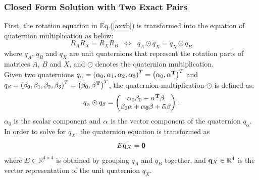 \documentclass[twocolumn,10pt]{asme2ej}
\newcommand{\qq}{{\bf q}}
\begin{document}
\subsubsection{Closed Form Solution with Two Exact Pairs}
First, the rotation equation in Eq.(\ref{axxb}) is transformed into the equation of quaternion multiplication as below:
\begin{equation}
R_{A}R_{X} = R_{X}R_{B} 
\; \;
\Leftrightarrow
\; \;
q_{A}\odot q_{X} = q_{X}\odot q_{B}
\label{Quaternion}
\end{equation} 
where $q_{A}$, $q_{B}$ and $q_{X}$ are
unit quaternions that represent the rotation parts of matrices $A$, $B$ and $X$, and $\odot$ denotes the  quaternion multiplication.\\
Given two quaternions $q_{\alpha} = \left( \alpha_{0}, \alpha_{1}, \alpha_{2},\alpha_{3} \right)^{T} = \left( \alpha_{0}, \bf{\alpha}^{T} \right)^{T}$ and $q_{\beta} = \left( \beta_{0}, \beta_{1}, \beta_{2},\beta_{3} \right)^{T} = \left(\beta_{0}, \bf{\beta}^{T} \right)^{T}$, the quaternion multiplication $\odot$ is defined as:
\begin{equation}
q_{\alpha}\odot q_{\beta} = 
\left(
\begin{matrix}
\alpha_{0} \beta_{0} - \bf{\alpha}^{T}\bf{\beta}\\
\beta_{0}\bf{\alpha} + \alpha_{0}\bf{\beta} + \bf{\tilde{\alpha}\beta}
\end{matrix}
\right).
\end{equation}
$\alpha_{0}$ is the scalar component and $\bf{\alpha}$ is the vector component of the quaternion $q_{\alpha}$.
In order to solve for $q_{X}$, the quaternion equation is transformed as
\begin{equation}
E\qq_{X} = \bf 0
\end{equation}
where $E \in \mathbb{R}^{4 \times 4}$ is obtained by grouping $q_{A}$ and $q_{B}$ together, and $\qq_{X} \in \mathbb{R}^4$ is the vector representation of the unit quaternion ${q_X}$.\\
\end{document}
